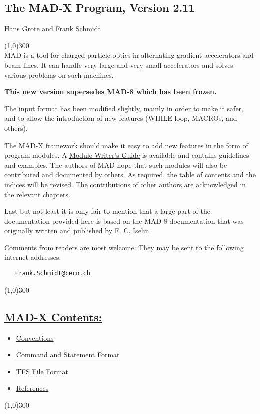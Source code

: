 



\begin{center}

\section{The MAD-X Program, Version 2.11}  
Hans Grote and Frank Schmidt 
\end{center}

\line(1,0){300}
\\
 MAD is a tool for charged-particle optics in alternating-gradient accelerators and beam lines. It can handle very large and very small accelerators and solves various problems on such machines. 

\textbf{{ This new version supersedes MAD-8 which has been  frozen.}}

 The input format has been modified slightly, mainly in order to make it safer, and to allow the introduction of new features (WHILE loop, MACROs, and others). 

 The MAD-X framework should make it easy to add new features in the form of program modules. A \href{module_doc.html}{ Module Writer's Guide} is available and contains guidelines and examples. The authors of MAD hope that such modules will also be contributed and documented by others. As required, the table of contents and the indices will be revised. The contributions of other authors are acknowledged in the relevant chapters. 

 Last but not least it is only fair to mention that a large part of the documentation provided here is based on the MAD-8 documentation that was originally written and published by F. C. Iselin. 

 Comments from readers are most welcome. They may be sent to the following internet addresses: 
\begin{verbatim}
   Frank.Schmidt@cern.ch
\end{verbatim}

\line(1,0){300}


\subsection{\href{contents-X}{MAD-X Contents:}}
\begin{itemize}
	\item \href{conventions.html}{Conventions}
	\item \href{format.html}{Command and Statement Format}


	\item \href{tfs.html}{TFS File Format}


	\item \href{bibliography.html}{References}
\end{itemize}

\line(1,0){300}


